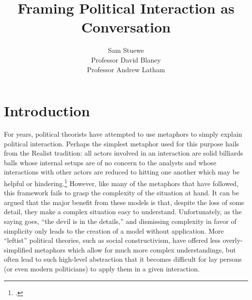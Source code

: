 \documentclass{article}
\begin{document}
\title{Framing Political Interaction as Conversation}
\author{Sam Stuewe\\ Professor David Blaney 
   \\ Professor Andrew Latham}
\maketitle
\thispagestyle{empty}
\newpage
\tableofcontents
\thispagestyle{empty}
\newpage
\setcounter{page}{1}
\section{Introduction}
For years, political theorists have attempted to use metaphors to simply explain political interaction. 
Perhaps the simplest metaphor used for this purpose hails from the Realist tradition: all actors involved in an interaction are solid billiards balls whose internal setups are of no concern to the analysts and whose interactions with other actors are reduced to hitting one another which may be helpful or hindering.\footcite{mearsheimer01} 
However, like many of the metaphors that have followed, this framework fails to grasp the complexity of the situation at hand. 
It can be argued that the major benefit from these models is that, despite the loss of some detail, they make a complex situation easy to understand. 
Unfortunately, as the saying goes, ``the devil is in the details,'' and dismissing complexity in favor of simplicity only leads to the creation of a model without application. 
More ``leftist'' political theories, such as social constructivism, have offered less overly-simplified metaphors which allow for much more complex understandings, but often lead to such high-level abstraction that it becomes difficult for lay persons (or even modern politicians) to apply them in a given interaction.
\end{document}
